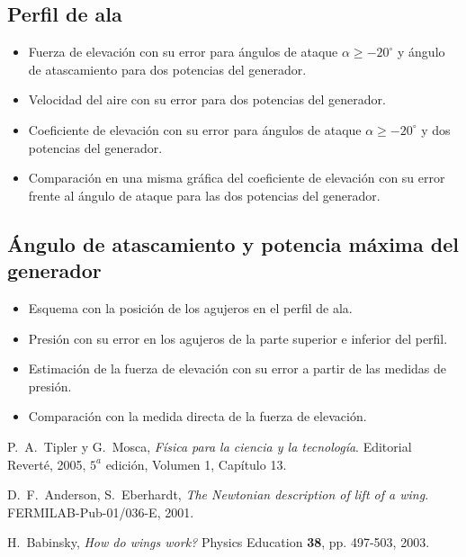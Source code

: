 \documentclass[11pt]{articulo}
\begin{document}
\subsection*{Perfil de ala}

\begin{itemize}

\item{Fuerza de elevaci\'on con su error para \'angulos de ataque $\alpha \geq -20^{\circ}$ y \'angulo de atascamiento para dos potencias del generador.}
\item{Velocidad del aire con su error para dos potencias del generador.}
\item{Coeficiente de elevaci\'on con su error para \'angulos de ataque $\alpha \geq -20^{\circ}$ y dos potencias del generador.}
\item{Comparaci\'on en una misma gr\'afica del coeficiente de elevaci\'on con su error frente al \'angulo de ataque para las dos potencias del generador.}

\end{itemize}

\subsection*{\'Angulo de atascamiento y potencia m\'axima del generador}

\begin{itemize}

\item{Esquema con la posici\'on de los agujeros en el perfil de ala.}
\item{Presi\'on con su error en los agujeros de la parte superior e inferior del perfil.}
\item{Estimaci\'on de la fuerza de elevaci\'on con su error a partir de las medidas de presi\'on.}
\item{Comparaci\'on con la medida directa de la fuerza de elevaci\'on.}

\end{itemize}



\begin{thebibliography}{X}

P.~A.~Tipler y G.~Mosca,
\textit{F\'isica para la ciencia y la tecnolog\'ia}. 
Editorial Revert\'e, 2005, $5^{a}$ edici\'on, Volumen 1, Cap\'itulo 13.

D.~F.~Anderson, S.~Eberhardt,
\textit{The Newtonian description of lift of a wing}.
FERMILAB-Pub-01/036-E, 2001.

H.~Babinsky,
{\it How do wings work?}
Physics Education {\bf 38}, pp. 497-503, 2003.

\end{thebibliography}


\end{document}
